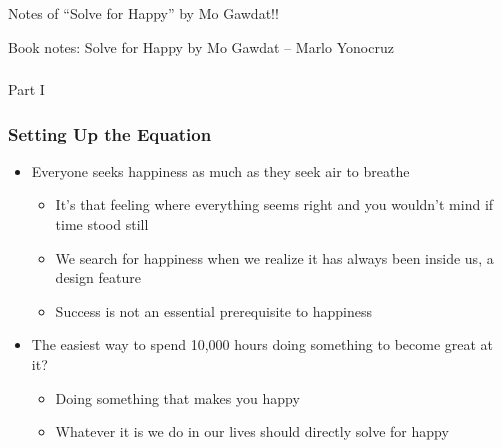 \begin{frame}[fragile]\frametitle{}
\begin{center}
{\Large Notes of ``Solve for Happy'' by Mo Gawdat!!}

{\tiny Book notes: Solve for Happy by Mo Gawdat – Marlo Yonocruz }

\end{center}
\end{frame}

\begin{frame}[fragile]\frametitle{}
\begin{center}
{\Large Part I}
\end{center}
\end{frame}


\begin{frame}[fragile]\frametitle{Setting Up the Equation}

\begin{itemize}
\item Everyone seeks happiness as much as they seek air to breathe
	\begin{itemize}
	\item It’s that feeling where everything seems right and you wouldn’t mind if time stood still
	\item We search for happiness when we realize it has always been inside us, a design feature
	\item Success is not an essential prerequisite to happiness
	\end{itemize}
\item The easiest way to spend 10,000 hours doing something to become great at it?
	\begin{itemize}
	\item Doing something that makes you happy
	\item Whatever it is we do in our lives should directly solve for happy
	\end{itemize}

\end{itemize}
\end{frame}

